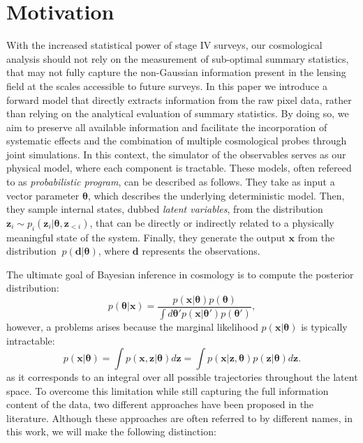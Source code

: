 \documentclass{aa}
\begin{document}
\section{Motivation}\label{Sec:Motivation}
With the increased statistical power of stage IV surveys, our cosmological analysis should not rely on the measurement of sub-optimal summary statistics, that may not fully capture the non-Gaussian information present in the lensing field at the scales accessible to future surveys. In this paper we introduce a forward model that directly extracts information from the raw pixel data, rather than relying on the analytical evaluation of summary statistics. By doing so, we aim to preserve all available information and facilitate the incorporation of systematic effects and the combination of multiple cosmological probes through joint simulations.
In this context, the simulator of the observables serves as our physical model, where each component is tractable. These models, often refereed to as \textit{probabilistic program}, can be described as follows. They take as input a vector parameter $\bm{\theta}$, which describes the underlying deterministic model. Then, they sample internal states, dubbed \textit{latent variables}, from the distribution $\bm{z}_i \sim p_i(\bm{z}_i|\bm \theta, \bm{z}_{<i})$, that can be directly or indirectly related to a physically meaningful state of the system. Finally, they generate the output $\bm x$ from the distribution $\ p(\bm d|\bm \theta)$, where $\bm{d}$ represents the observations. 


The ultimate goal of Bayesian inference in cosmology is to compute the posterior distribution:
\begin{equation}\label{Eq:posterior}
     p(\bm{\theta}|\bm{x})= 
     \frac{p(\bm{x}|\bm{\theta})p(\bm{\theta})}
     {\int d\bm{\theta'}p(\bm{x}|\bm{\theta}')p(\bm{\theta}')},
\end{equation}
however, a problems arises because the marginal likelihood $p(\bm{x}|\bm{\theta})$ is typically intractable:
\begin{equation}
    p(\bm{x}|\bm{\theta})=\int p(\bm{x},\bm{z}|\bm{\theta}) d\bm{z}=\int p(\bm{x}|\bm{z},\bm{\theta})p(\bm{z}|\bm{\theta}) d\bm{z}.
\end{equation}
as it corresponds to an integral over all possible trajectories throughout the latent space.
To overcome this limitation while still capturing the full information content of the data, two different approaches have been proposed in the literature. Although these approaches are often referred to by different names, in this work, we will make the following distinction:
\end{document}
